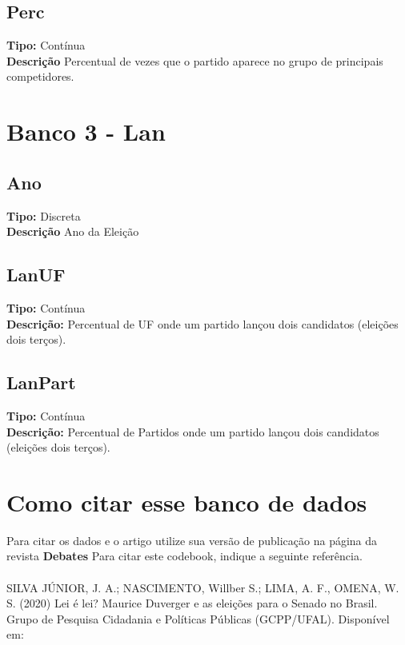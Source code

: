 \documentclass[12pt]{article}
\begin{document}
		\subsection{Perc}
		{\bf Tipo:} Contínua \\
		{\bf Descrição} Percentual de vezes que o partido aparece no grupo de principais competidores.\\
		
		
		
		
		\section{Banco 3 - Lan}
		\subsection{Ano}
		{\bf Tipo:} Discreta \\
		{\bf Descrição} Ano da Eleição \\
		
		\subsection{LanUF}
		{\bf Tipo:} Contínua \\
		{\bf Descrição:} Percentual de UF onde um partido lançou dois candidatos (eleições dois terços).
		
		\subsection{LanPart}
		{\bf Tipo:} Contínua \\
		{\bf Descrição:} Percentual de Partidos onde um partido lançou dois candidatos (eleições dois terços).\\
		
	
		
	\section{Como citar esse banco de dados}
	Para citar os dados e o artigo utilize sua versão de publicação na página da revista  \textbf{Debates}
	Para citar este codebook, indique a seguinte referência.
	\\ \\
	SILVA JÚNIOR, J. A.; NASCIMENTO, Willber S.; LIMA, A. F., OMENA, W. S. (2020)  
	Lei é lei? Maurice Duverger e as eleições para o Senado no Brasil. Grupo de Pesquisa Cidadania e Políticas Públicas (GCPP/UFAL). Disponível em:	
\end{document}

